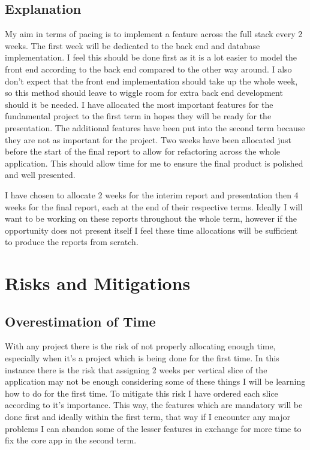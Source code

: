 \documentclass{article}
\begin{document}
\subsection{Explanation}
My aim in terms of pacing is to implement a feature across the full stack every 2 weeks. The first week will be dedicated to the back end and database implementation. I feel this should be done first as it is a lot easier to model the front end according to the back end compared to the other way around. I also don't expect that the front end implementation should take up the whole week, so this method should leave to wiggle room for extra back end development should it be needed. I have allocated the most important features for the fundamental project to the first term in hopes they will be ready for the presentation. The additional features have been put into the second term because they are not as important for the project. Two weeks have been allocated just before the start of the final report to allow for refactoring across the whole application. This should allow time for me to ensure the final product is polished and well presented.

I have chosen to allocate 2 weeks for the interim report and presentation then 4 weeks for the final report, each at the end of their respective terms. Ideally I will want to be working on these reports throughout the whole term, however if the opportunity does not present itself I feel these time allocations will be sufficient to produce the reports from scratch.

\section{Risks and Mitigations}

\subsection{Overestimation of Time}
With any project there is the risk of not properly allocating enough time, especially when it's a project which is being done for the first time. In this instance there is the risk that assigning 2 weeks per vertical slice of the application may not be enough considering some of these things I will be learning how to do for the first time. To mitigate this risk I have ordered each slice according to it's importance. This way, the features which are mandatory will be done first and ideally within the first term, that way if I encounter any major problems I can abandon some of the lesser features in exchange for more time to fix the core app in the second term.
\end{document}
